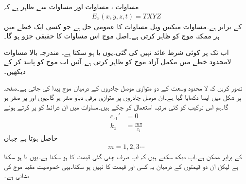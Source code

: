 مساوات ، مساوات  اور مساوات  سے ظاہر ہے کہ
\begin{align}\label{مساوات_مویج_گھمکی_عمومی_ت}
E_x(x,y,z,t)=T X Y Z 
\end{align}
کے برابر ہے۔مساوات  میکس ویل مساوات کا عمومی حل ہے جو کسی ایک خطے میں ہر ممکنہ  موج کو ظاہر کرتی ہے۔اصل موج اس مساوات کا حقیقی  جزو ہو گا۔

اب تک  پر کوئی شرط عائد نہیں کی گئی۔یوں  یا  ہو سکتا ہے۔ مندرجہ بالا مساوات لامحدود خطے میں مکمل آزاد موج کو ظاہر کرتی ہے۔آئیں اب موج کو پابند کر کے دیکھیں۔ 

تصور کریں کہ لا محدود وسعت کے دو متوازی موصل چادروں کے درمیان موج پیدا کی جاتی ہے۔صفحہ  پر شکل  میں ایسا دکھایا گیا ہے۔ان موصل چادروں پر متوازی برقی دباو صفر ہو گا۔یوں  اور  پر  صفر ہو گا۔ہم 
اس ترکیب کو کئی مرتبہ استعمال کر چکے ہیں۔مساوات  میں ان شرائط کو پر کرتے ہوئے 
\begin{align}
c_{z1}'&=0\\
k_z &=\frac{m \pi}{z_1}\label{مساوات_مویج_میکس_ویل_عمومی_مستطیلی_شرط_الف}
\end{align}
حاصل ہوتا ہے جہاں
\begin{align}
m=1,2,3\cdots
\end{align}
کے برابر ممکن ہے۔آپ دیکھ سکتے ہیں کہ  اب صرف چنی گئی قیمت کا ہو سکتا ہے۔یوں  یا   ہو سکتا ہے لیکن ان دو قیمتوں کے درمیان یہ کسی اور قیمت کا نہیں ہو سکتا۔یہی خصوصیت مقید موج کی نشانی ہے۔

